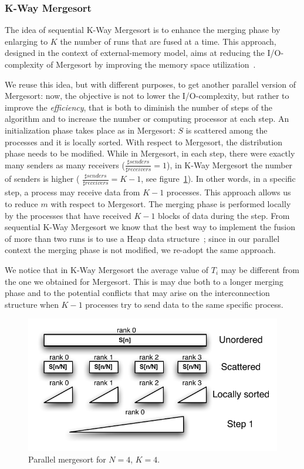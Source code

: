 \subsubsection{K-Way Mergesort}
The idea of sequential K-Way Mergesort is to enhance the merging phase by enlarging to $K$ the number of runs that are fused at a time. This approach, designed in the context of external-memory model, aims at reducing the I/O-complexity of Mergesort by improving the memory space utilization~\cite{FERR}. 

We reuse this idea, but with different purposes, to get another parallel version of Mergesort: now, the objective is not to lower the I/O-complexity, but rather to improve the \textit{efficiency}, that is both to diminish the number of steps of the algorithm and to increase the number or computing processor at each step. An initialization phase takes place as in Mergesort: $S$ is scattered among the processes and it is locally sorted. With respect to Mergesort, the distribution phase needs to be modified. While in Mergesort, in each step, there were exactly many senders as many receivers ($\frac{\sharp senders}{\sharp receivers} = 1$), in K-Way Mergesort the number of senders is higher ( $\frac{\sharp senders}{\sharp receivers} = K - 1$, see figure~\ref{k-merge-dist}). In other words, in a specific step, a process may receive data from $K-1$ processes. This approach allows us to reduce $m$ with respect to Mergesort. The merging phase is performed locally by the processes that have received $K-1$ blocks of data during the step. From sequential K-Way Mergesort we know that the best way to implement the fusion of more than two runs is to use a Heap data structure~\cite{FERR}; since in our parallel context the merging phase is not modified, we re-adopt the same approach.

We notice that in K-Way Mergesort the average value of $T_i$ may be different from the one we obtained for Mergesort. This is may due both to a longer merging phase and to the potential conflicts that may arise on the interconnection structure when $K-1$ processes try to send data to the same specific process.

\begin{figure}[h]
        \centerline{
               \mbox{\includegraphics[scale=0.70]{kmerge-pict1}}
        }
        \caption{Parallel mergesort for $N = 4$, $K = 4$.}
        \label{k-merge-dist}
\end{figure}

